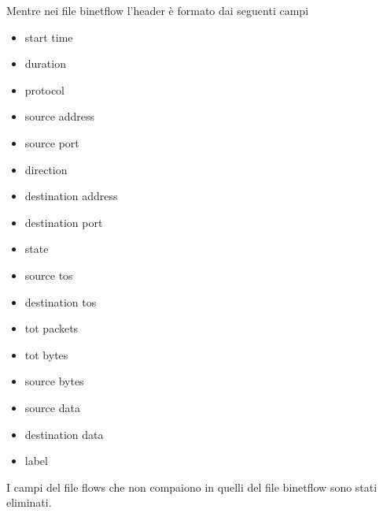 \documentclass[11pt,a4paper,twoside,openright]{book}
\begin{document}
Mentre nei file binetflow l'header è formato dai seguenti campi

\begin{itemize}

\item{start time}
\item{duration}
\item{protocol}
\item{source address}
\item{source port}
\item{direction}
\item{destination address}
\item{destination port}
\item{state}
\item{source tos}
\item{destination tos}
\item{tot packets}
\item{tot bytes}
\item{source bytes}
\item{source data}
\item{destination data}
\item{label}

\end{itemize}

I campi del file flows che non compaiono in quelli del file binetflow sono stati eliminati. 
\end{document}
